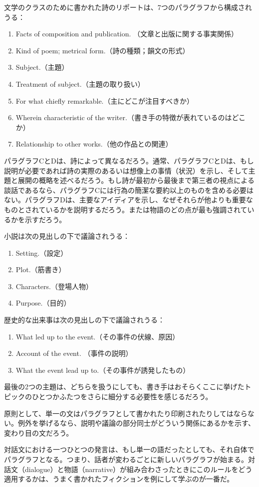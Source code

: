 文学のクラスのために書かれた詩のリポートは、7つのパラグラフから構成されうる：
\begin{enumerate}[label=\Alph*.]
    \item Facts of composition and publication. （文章と出版に関する事実関係）
    \item Kind of poem; metrical form.（詩の種類；韻文の形式）
    \item Subject.（主題）
    \item Treatment of subject.（主題の取り扱い）
    \item For what chiefly remarkable.（主にどこが注目すべきか）
    \item Wherein characteristic of the writer.（書き手の特徴が表れているのはどこか）
    \item Relationship to other works.（他の作品との関連）
\end{enumerate}
パラグラフCとDは、詩によって異なるだろう。通常、パラグラフCとDは、もし説明が必要であれば詩の実際のあるいは想像上の事情（状況）を示し、そして主題と展開の概略を述べるだろう。もし詩が最初から最後まで第三者の視点による談話であるなら、パラグラフCには行為の簡潔な要約以上のものを含める必要はない。パラグラフDは、主要なアイディアを示し、なぜそれらが他よりも重要なものとされているかを説明するだろう。または物語のどの点が最も強調されているかを示すだろう。
\par
小説は次の見出しの下で議論されうる：
\begin{enumerate}[label=\Alph*.]
    \item Setting.（設定）
    \item Plot.（筋書き）
    \item Characters.（登場人物）
    \item Purpose.（目的）
\end{enumerate}
歴史的な出来事は次の見出しの下で議論されうる：
\begin{enumerate}[label=\Alph*.]
    \item What led up to the event.（その事件の伏線、原因）
    \item Account of the event. （事件の説明）
    \item What the event lead up to.（その事件が誘発したもの） 
\end{enumerate}
最後の2つの主題は、どちらを扱うにしても、書き手はおそらくここに挙げたトピックのひとつかふたつをさらに細分する必要性を感じるだろう。
\par
原則として、単一の文はパラグラフとして書かれたり印刷されたりしてはならない。例外を挙げるなら、説明や議論の部分同士がどういう関係にあるかを示す、変わり目の文だろう。
\par
対話文における一つひとつの発言は、もし単一の語だったとしても、それ自体でパラグラフとなる。つまり、話者が変わるごとに新しいパラグラフが始まる。対話文（dialogue）と物語（narrative）が組み合わさったときにこのルールをどう適用するかは、うまく書かれたフィクションを例にして学ぶのが一番だ。
